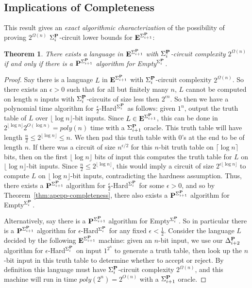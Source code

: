 \documentclass[11pt]{article}
\newtheorem{theorem}{Theorem}
\def\cl{\bf}
\begin{document}
\subsection{Implications of Completeness}
This result gives an \emph{exact algorithmic characterization} of the possibility of proving $2^{\Omega(n)}$ $\Sigma^{\cl P}_i$-circuit lower bounds for ${\cl E}^{\Sigma^{\cl P}_{i+1}}$:
\begin{theorem}\label{thm:LB-algo-equivalence}
There exists a language in ${\cl E}^{\Sigma^{\cl P}_{i+1}}$ with $\Sigma^{\cl P}_i$-circuit complexity $2^{\Omega(n)}$ if and only if there is a ${\cl P}^{\Sigma_{i+1}^{\cl P}}$ algorithm for {\sc Empty}$^{\Sigma^{\cl P}_i}$.
\end{theorem}
\begin{proof}
Say there is a language $L$ in ${\cl E}^{\Sigma^{\cl P}_{i+1}}$ with $\Sigma^{\cl P}_i$-circuit complexity $2^{\Omega(n)}$. So there exists an $\epsilon > 0$ such that for all but finitely many $n$, $L$ cannot be computed on length $n$ inputs with $\Sigma^{\cl P}_i$-circuits of size less then $2^{\epsilon n}$. So then we have a polynomial time algorithm for {\sc $\frac{\epsilon}{2}$-Hard}$^{\Sigma^{\cl P}_i}$ as follows: given $1^n$, output the truth table of $L$ over $\lfloor \log n \rfloor$-bit inputs. Since $L \in {\cl E}^{\Sigma^{\cl P}_{i+1}}$, this can be done in $2^{\lfloor \log n \rfloor}2^{O(\log n)} = poly(n)$ time with a $\Sigma^{\cl P}_{i+1}$ oracle. This truth table will have length $\frac{n}{2} \leq 2^{\lfloor \log n \rfloor} \leq n$. We then pad this truth table with 0's at the end to be of length $n$. If there was a circuit of size $n^{\epsilon/2}$ for this $n$-bit truth table on $\lceil \log n \rceil$ bits, then on the first $\lfloor \log n \rfloor$ bits of input this computes the truth table for $L$ on $\lfloor \log n \rfloor$-bit inputs. Since $\frac{n}{2} \leq 2^{\lfloor \log n \rfloor}$, this would imply a circuit of size $2^{\epsilon \lfloor \log n \rfloor}$ to compute $L$ on $\lfloor \log n \rfloor$-bit inputs, contradicting the hardness assumption. Thus, there exists a ${\cl P}^{\Sigma_{i+1}^{\cl P}}$ algorithm for {\sc $\frac{\epsilon}{2}$-Hard}$^{\Sigma^{\cl P}_i}$ for some $\epsilon > 0$, and so by Theorem~\ref{thm:apepp-completeness}, there also exists a ${\cl P}^{\Sigma_{i+1}^{\cl P}}$ algorithm for {\sc Empty}$^{\Sigma^{\cl P}_i}$.

Alternatively, say there is a ${\cl P}^{\Sigma_{i+1}^{\cl P}}$ algorithm for {\sc Empty}$^{\Sigma^{\cl P}_i}$. So in particular there is a ${\cl P}^{\Sigma_{i+1}^{\cl P}}$ algorithm for {\sc $\epsilon$-Hard}$^{\Sigma^{\cl P}_i}$ for any fixed $\epsilon < \frac{1}{2}$. Consider the language $L$ decided by the following ${\cl E}^{\Sigma^{\cl P}_{i+1}}$ machine: given an $n$-bit input, we use our $\Delta^{\cl P}_{i+2}$ algorithm for {\sc $\epsilon$-Hard}$^{\Sigma^{\cl P}_i}$ on input $1^{2^n}$ to generate a truth table, then look up the $n$-bit input in this truth table to determine whether to accept or reject. By definition this language must have $\Sigma^{\cl P}_i$-circuit complexity $2^{\Omega(n)}$, and this machine will run in time $poly(2^n) = 2^{O(n)}$ with a $\Sigma^{\cl P}_{i+1}$ oracle.
\end{proof}
\end{document}
